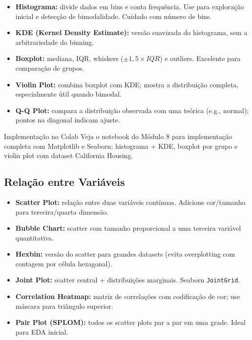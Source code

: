 \documentclass[12pt,a4paper]{article}
\begin{document}
\begin{itemize}
  \item \textbf{Histograma:} divide dados em bins e conta frequência. Use para exploração inicial e detecção de bimodalidade. Cuidado com número de bins.
  \item \textbf{KDE (Kernel Density Estimate):} versão suavizada do histograma, sem a arbitrariedade do binning.
  \item \textbf{Boxplot:} mediana, IQR, whiskers ($\pm 1{,}5 \times IQR$) e outliers. Excelente para comparação de grupos.
  \item \textbf{Violin Plot:} combina boxplot com KDE; mostra a distribuição completa, especialmente útil quando bimodal.
  \item \textbf{Q-Q Plot:} compara a distribuição observada com uma teórica (e.g., normal); pontos na diagonal indicam ajuste.
\end{itemize}

\begin{dicabox}{Implementação no Colab}
Veja o notebook do Módulo 8 para implementação completa com Matplotlib e Seaborn: histograma + KDE, boxplot por grupo e violin plot com dataset California Housing.
\end{dicabox}

\subsection{Relação entre Variáveis}

\begin{itemize}
  \item \textbf{Scatter Plot:} relação entre duas variáveis contínuas. Adicione cor/tamanho para terceira/quarta dimensão.
  \item \textbf{Bubble Chart:} scatter com tamanho proporcional a uma terceira variável quantitativa.
  \item \textbf{Hexbin:} versão do scatter para grandes datasets (evita overplotting com contagem por célula hexagonal).
  \item \textbf{Joint Plot:} scatter central + distribuições marginais. Seaborn \texttt{JointGrid}.
  \item \textbf{Correlation Heatmap:} matriz de correlações com codificação de cor; use máscara para triângulo superior.
  \item \textbf{Pair Plot (SPLOM):} todos os scatter plots par a par em uma grade. Ideal para EDA inicial.
\end{itemize}
\end{document}
